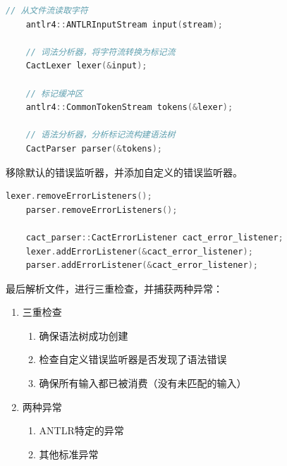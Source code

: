 \documentclass[UTF8]{report}
\begin{document}
\begin{lstlisting}[language=C++]
    // 从文件流读取字符
    antlr4::ANTLRInputStream input(stream);

    // 词法分析器，将字符流转换为标记流
    CactLexer lexer(&input);

    // 标记缓冲区
    antlr4::CommonTokenStream tokens(&lexer);

    // 语法分析器，分析标记流构建语法树
    CactParser parser(&tokens);
\end{lstlisting}

移除默认的错误监听器，并添加自定义的错误监听器。

\begin{lstlisting}[language=C++]
    lexer.removeErrorListeners();
    parser.removeErrorListeners();

    cact_parser::CactErrorListener cact_error_listener;
    lexer.addErrorListener(&cact_error_listener);
    parser.addErrorListener(&cact_error_listener);
\end{lstlisting}

最后解析文件，进行三重检查，并捕获两种异常：

\begin{enumerate}
    \item 三重检查
    \begin{enumerate}
        \item 确保语法树成功创建
        \item 检查自定义错误监听器是否发现了语法错误
        \item 确保所有输入都已被消费（没有未匹配的输入）
    \end{enumerate}
    \item 两种异常
    \begin{enumerate}
        \item ANTLR特定的异常
        \item 其他标准异常
    \end{enumerate}
\end{enumerate}
\end{document}
